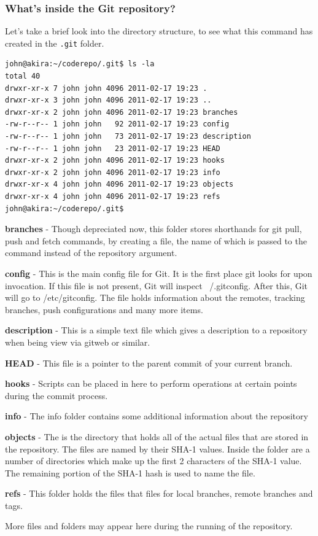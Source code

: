 \begin{framed}
\subsubsection{What's inside the Git repository?}

Let's take a brief look into the directory structure, to see what this command has created in the \texttt{.git} folder.

\begin{Verbatim}[frame=single,fontsize=\relsize{-3}] 
john@akira:~/coderepo/.git$ ls -la 
total 40 
drwxr-xr-x 7 john john 4096 2011-02-17 19:23 . 
drwxr-xr-x 3 john john 4096 2011-02-17 19:23 .. 
drwxr-xr-x 2 john john 4096 2011-02-17 19:23 branches 
-rw-r--r-- 1 john john   92 2011-02-17 19:23 config 
-rw-r--r-- 1 john john   73 2011-02-17 19:23 description 
-rw-r--r-- 1 john john   23 2011-02-17 19:23 HEAD 
drwxr-xr-x 2 john john 4096 2011-02-17 19:23 hooks 
drwxr-xr-x 2 john john 4096 2011-02-17 19:23 info 
drwxr-xr-x 4 john john 4096 2011-02-17 19:23 objects 
drwxr-xr-x 4 john john 4096 2011-02-17 19:23 refs 
john@akira:~/coderepo/.git$ 
\end{Verbatim} 

\textbf{branches} - Though depreciated now, this folder stores shorthands for git pull, push and fetch commands, by creating a file, the name of which is passed to the command instead of the repository argument.

\textbf{config} - This is the main config file for Git.  It is the first place git looks for upon invocation.  If this file is not present, Git will inspect ~/.gitconfig.  After this, Git will go to /etc/gitconfig.  The file holds information about the remotes, tracking branches, push configurations and many more items.

\textbf{description} - This is a simple text file which gives a description to a repository when being view via gitweb or similar.

\textbf{HEAD} - This file is a pointer to the parent commit of your current branch.

\textbf{hooks} - Scripts can be placed in here to perform operations at certain points during the commit process.

\textbf{info} - The info folder contains some additional information about the repository

\textbf{objects} - The is the directory that holds all of the actual files that are stored in the repository.  The files are named by their SHA-1 values.  Inside the folder are a number of directories which make up the first 2 characters of the SHA-1 value.  The remaining portion of the SHA-1 hash is used to name the file.

\textbf{refs} - This folder holds the files that files for local branches, remote branches and tags.

More files and folders may appear here during the running of the repository.
\end{framed}

